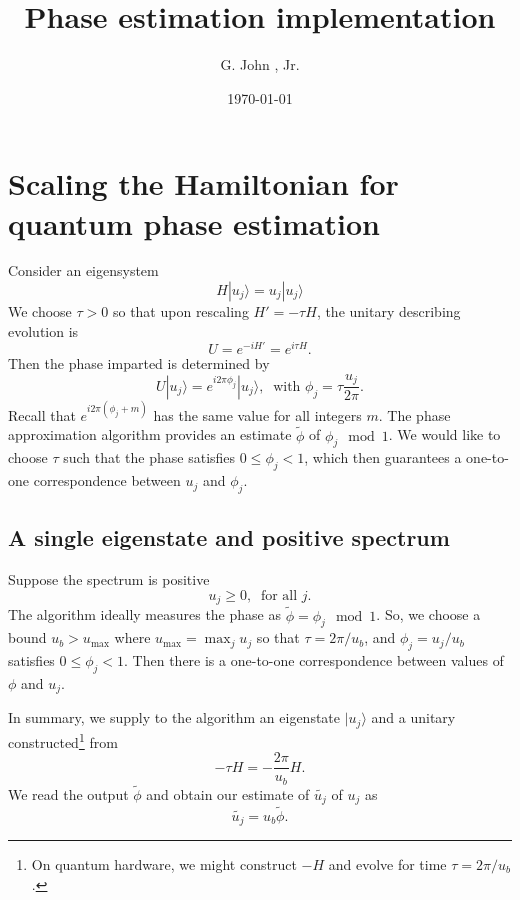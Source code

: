 \documentclass[superscriptaddress,nofootinbib,longbibliography,aps,pre]{revtex4-1}
\newcommand{\ket}[1]{|{#1}\rangle}
\newcommand{\umax}{u_{\text{max}}}
\newcommand{\aphi}{\tilde{\phi}}
\begin{document}
\title{Phase estimation implementation}
\author{G. John , Jr.}
\date{\today}

{
\let\clearpage\relax
\maketitle
}

\section{Scaling the Hamiltonian for quantum phase estimation}

Consider an eigensystem
%
\begin{equation}
  H\ket{u_{j}} = u_{j}\ket{u_{j}}
\end{equation}
%
We choose $\tau>0$ so that upon rescaling $H' = -\tau H$, the unitary describing evolution is
%
\begin{equation}
  U = e^{-i H'} = e^{i\tau H}.
\end{equation}
%
Then the phase imparted is determined by
%
\begin{equation}
  U\ket{u_{j}} = e^{i2\pi\phi_{j}} \ket{u_{j}}, \ \text{ with } \phi_{j}=\tau \frac{u_{j}}{2\pi}.
\end{equation}
%
Recall that $e^{i2\pi(\phi_{j} + m)}$ has the same value for all integers $m$.
The phase approximation algorithm provides an estimate
$\aphi$ of $\phi_{j} \!\!\mod 1$.
We would like to choose $\tau$ such that the phase satisfies $0\le \phi_{j} < 1$,
which then guarantees a one-to-one correspondence between $u_{j}$ and $\phi_{j}$.

\subsection{A single eigenstate and positive spectrum}

Suppose the spectrum is positive
%
\begin{equation}
  u_{j} \ge 0, \ \text{ for all } j.
\end{equation}
%
The algorithm ideally measures the phase as $\aphi = \phi_{j}\mod 1$.
So, we choose a bound $u_{b} > \umax$ where  $\umax = \max_{j} u_{j}$
so that $\tau = 2\pi/u_{b}$, and $\phi_{j} = u_{j}/u_{b}$ satisfies $0\le \phi_{j}<1$.
Then there is a one-to-one correspondence between values
of $\phi$ and $u_{j}$.

In summary, we supply to the algorithm
an eigenstate $\ket{u_{j}}$ and a unitary
constructed\footnote{%
  On quantum hardware, we might construct $-H$ and evolve for time $\tau = 2\pi/u_{b}$.
 }
from
%
\begin{equation}
  -\tau H = -\frac{2\pi}{u_{b}} H.
\end{equation}
%
We read the output $\aphi$ and obtain our estimate of $\tilde{u_{j}}$ of $u_{j}$ as
%
\begin{equation}
  \tilde{u_{j}} = u_{b} \aphi.
\end{equation}
%
\end{document}
